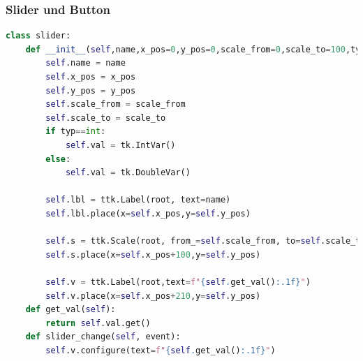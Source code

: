 \documentclass{article}
\begin{document}
\subsubsection{Slider und Button}
\begin{lstlisting}[language=Python]
class slider:    
	def __init__(self,name,x_pos=0,y_pos=0,scale_from=0,scale_to=100,typ=int):
		self.name = name
		self.x_pos = x_pos
		self.y_pos = y_pos
		self.scale_from = scale_from
		self.scale_to = scale_to
		if typ==int: 
			self.val = tk.IntVar() 
		else: 
			self.val = tk.DoubleVar() 

		self.lbl = ttk.Label(root, text=name)
		self.lbl.place(x=self.x_pos,y=self.y_pos)

		self.s = ttk.Scale(root, from_=self.scale_from, to=self.scale_to, 	orient="horizontal",command=self.slider_change,variable=self.val)
		self.s.place(x=self.x_pos+100,y=self.y_pos)

		self.v = ttk.Label(root,text=f"{self.get_val():.1f}")
		self.v.place(x=self.x_pos+210,y=self.y_pos)
	def get_val(self):
		return self.val.get()
	def slider_change(self, event):
		self.v.configure(text=f"{self.get_val():.1f}")
\end{lstlisting}
\end{document}
